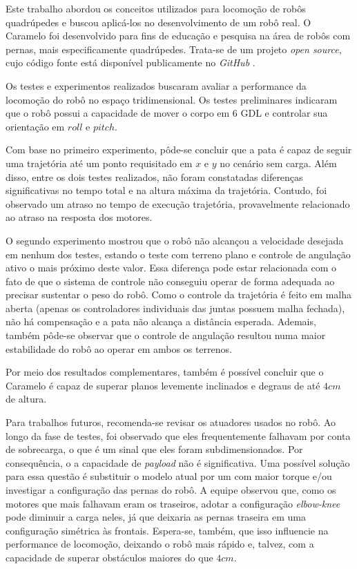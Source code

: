 \documentclass[../main.tex]{subfiles}
\begin{document}
  Este trabalho abordou os conceitos utilizados para locomoção de robôs quadrúpedes e buscou aplicá-los no desenvolvimento de um robô real. O Caramelo foi desenvolvido para fins de educação e pesquisa na área de robôs com pernas, mais especificamente quadrúpedes. Trata-se de um projeto \textit{open source}, cujo código fonte está disponível publicamente no \textit{GitHub} \cite{caramel_repo}. 
  
  Os testes e experimentos realizados buscaram avaliar a performance da locomoção do robô no espaço tridimensional. Os testes preliminares indicaram que o robô possui a capacidade de mover o corpo em 6 GDL e controlar sua orientação em $roll$ e $pitch$. 
  
  Com base no primeiro experimento, pôde-se concluir que a pata é capaz de seguir uma trajetória até um ponto requisitado em $x$ e $y$ no cenário sem carga. Além disso, entre os dois testes realizados, não foram constatadas diferenças significativas no tempo total e na altura máxima da trajetória. Contudo, foi observado um atraso no tempo de execução trajetória, provavelmente relacionado ao atraso na resposta dos motores.
   
  O segundo experimento mostrou que o robô não alcançou a velocidade desejada em nenhum dos testes, estando o teste com terreno plano e controle de angulação ativo o mais próximo deste valor. Essa diferença pode estar relacionada com o fato de que o sistema de controle não conseguiu operar de forma adequada ao precisar sustentar o peso do robô. Como o controle da trajetória é feito em malha aberta (apenas os controladores individuais das juntas possuem malha fechada), não há compensação e a pata não alcança a distância esperada. Ademais, também pôde-se observar que o controle de angulação resultou numa maior estabilidade do robô ao operar em ambos os terrenos.
  
  Por meio dos resultados complementares, também é possível concluir que o Caramelo é capaz de superar planos levemente inclinados e degraus de até $4cm$ de altura. 

  Para trabalhos futuros, recomenda-se revisar os atuadores usados no robô. Ao longo da fase de testes, foi observado que eles frequentemente falhavam por conta de sobrecarga, o que é um sinal que eles foram subdimensionados. Por consequência, o a capacidade de \textit{payload} não é significativa. Uma possível solução para essa questão é substituir o modelo atual por um com maior torque e/ou investigar a configuração das pernas do robô. A equipe observou que, como os motores que mais falhavam eram os traseiros, adotar a configuração \textit{elbow-knee} pode diminuir a carga neles, já que deixaria as pernas traseira em uma configuração simétrica às frontais. Espera-se, também, que isso influencie na performance de locomoção, deixando o robô mais rápido e, talvez, com a capacidade de superar obstáculos maiores do que $4cm$.  
\end{document}
